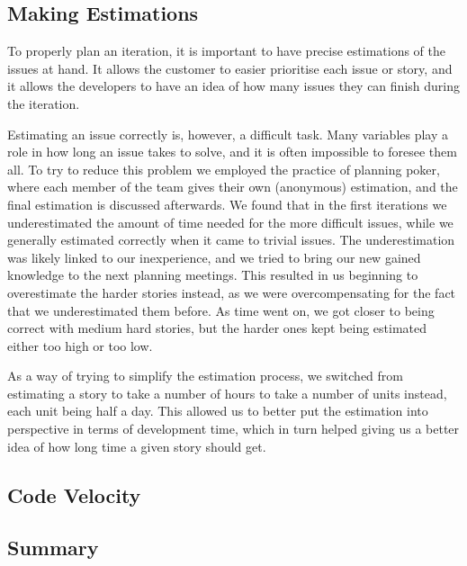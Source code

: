 \subsection{Making Estimations}
To properly plan an iteration, it is important to have precise estimations of the issues at hand.
It allows the customer to easier prioritise each issue or story, and it allows the developers to have an idea of how many issues they can finish during the iteration.

Estimating an issue correctly is, however, a difficult task.
Many variables play a role in how long an issue takes to solve, and it is often impossible to foresee them all.
To try to reduce this problem we employed the practice of planning poker, where each member of the team gives their own (anonymous) estimation, and the final estimation is discussed afterwards.
We found that in the first iterations we underestimated the amount of time needed for the more difficult issues, while we generally estimated correctly when it came to trivial issues.
The underestimation was likely linked to our inexperience, and we tried to bring our new gained knowledge to the next planning meetings.
This resulted in us beginning to overestimate the harder stories instead, as we were overcompensating for the fact that we underestimated them before.
As time went on, we got closer to being correct with medium hard stories, but the harder ones kept being estimated either too high or too low.

As a way of trying to simplify the estimation process, we switched from estimating a story to take a number of hours to take a number of units instead, each unit being half a day.
This allowed us to better put the estimation into perspective in terms of development time, which in turn helped giving us a better idea of how long time a given story should get.

\subsection{Code Velocity}

\subsection{Summary}
